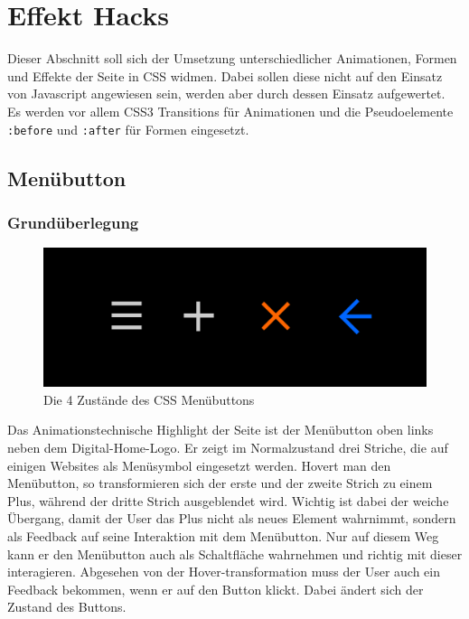 \section{Effekt Hacks}

Dieser Abschnitt soll sich der Umsetzung unterschiedlicher Animationen, Formen und Effekte der Seite in CSS widmen. Dabei sollen diese nicht auf den Einsatz von Javascript angewiesen sein, werden aber durch dessen Einsatz aufgewertet.
Es werden vor allem CSS3 Transitions für Animationen und die Pseudoelemente \lstinline{:before} und \lstinline{:after} für Formen eingesetzt.
\subsection{Menübutton}
\subsubsection{Grundüberlegung}

\begin{figure} [h]
\includegraphics[width=\textwidth]{./img/css_buttons1.png}
\caption{Die 4 Zustände des CSS Menübuttons}
\label{css_buttons1}
\end{figure}

Das Animationstechnische Highlight der Seite ist der Menübutton oben links neben dem Digital-Home-Logo. Er zeigt im Normalzustand drei Striche, die auf einigen Websites als Menüsymbol eingesetzt werden. Hovert man den Menübutton, so transformieren sich der erste und der zweite Strich zu einem Plus, während der dritte Strich ausgeblendet wird. Wichtig ist dabei der weiche Übergang, damit der User das Plus nicht als neues Element wahrnimmt, sondern als Feedback auf seine Interaktion mit dem Menübutton. Nur auf diesem Weg kann er den Menübutton auch als Schaltfläche wahrnehmen und richtig mit dieser interagieren. Abgesehen von der Hover-transformation muss der User auch ein Feedback bekommen, wenn er auf den Button klickt. Dabei ändert sich der Zustand des Buttons.

